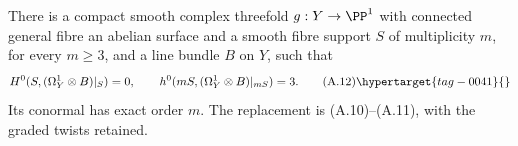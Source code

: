 
\begin{proposition}\hypertarget{tag-01AM}{}\label{cdp:st:A.3.2}


There is a compact smooth complex threefold $g:Y\to\PP^1$ with connected general fibre an abelian surface and a smooth fibre support $S$ of multiplicity $m$, for every $m\ge3$, and a line bundle $B$ on $Y$, such that
\[
H^0(S,(\Omega_Y^1\otimes B)|_S)=0,
\qquad h^0(mS,(\Omega_Y^1\otimes B)|_{mS})=3.
\tag{A.12}\hypertarget{tag-0041}{}\label{cdp:eq:A.12}
\]
Its conormal has exact order $m$. The replacement is (A.10)--(A.11), with the graded twists retained.
\end{proposition}

